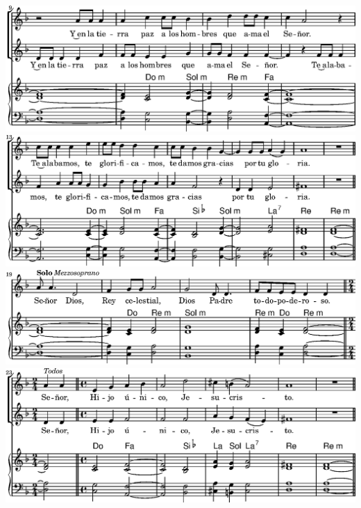   \linebreak
\else
  \expandafter{}%
\fi
\includegraphics{99/lily-924018f8-7}%
\ifx\betweenLilyPondSystem \undefined
  \linebreak
\else
  \expandafter{}%
\fi
\includegraphics{99/lily-924018f8-8}%
\ifx\betweenLilyPondSystem \undefined
  \linebreak
\else
  \expandafter{}%
\fi
\includegraphics{99/lily-924018f8-9}%
\ifx\betweenLilyPondSystem \undefined
  \linebreak
\else
  \expandafter{}%
\fi
\includegraphics{99/lily-924018f8-10}%
\ifx\betweenLilyPondSystem \undefined

